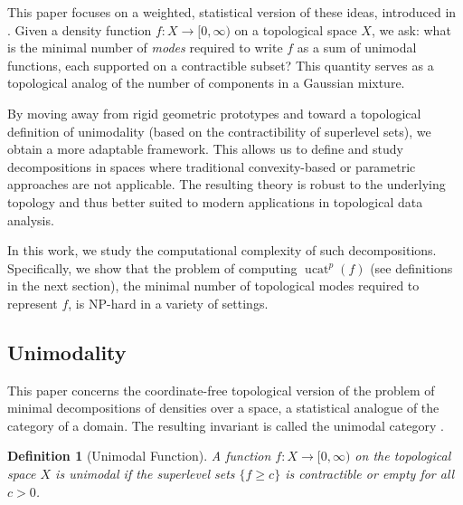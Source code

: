 \documentclass[11pt]{article}
\DeclareMathOperator{\ucat}{ucat}
\newtheorem{dfn}[thm]{Definition}
\begin{document}

This paper focuses on a weighted, statistical version of these ideas, introduced in \cite{baryshnikov_unimodal_2011}. Given a density function $f: X \to [0, \infty)$ on a topological space $X$, we ask: what is the minimal number of \emph{modes} required to write $f$ as a sum of unimodal functions, each supported on a contractible subset? This quantity serves as a topological analog of the number of components in a Gaussian mixture. %

By moving away from rigid geometric prototypes and toward a topological definition of unimodality (based on the contractibility of superlevel sets), we obtain a more adaptable framework. This allows us to define and study decompositions in spaces where traditional convexity-based or parametric approaches are not applicable. The resulting theory is robust to the underlying topology and thus better suited to modern applications in topological data analysis.

In this work, we study the computational complexity of such decompositions. Specifically, we show that the problem of computing $\ucat^p(f)$ (see definitions in the next section), the minimal number of topological modes required to represent $f$, is NP-hard in a variety of settings.


\subsection{Unimodality}
This paper concerns the coordinate-free topological version of the problem of minimal decompositions of densities over a space, a statistical analogue of the category of a domain. The resulting invariant is called the unimodal category \cite{baryshnikov_unimodal_2011}.

\begin{dfn}[Unimodal Function]
A function $f : X \rightarrow [0, \infty)$ on the topological space $X$ is unimodal if the superlevel sets $\{ f \geq c \}$ is contractible or empty for all $c > 0$.
\end{dfn}
\end{document}
